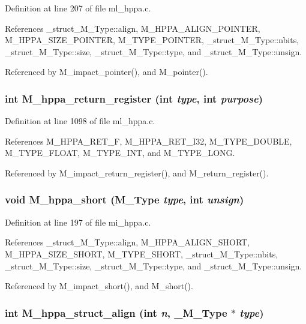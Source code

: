 Definition at line 207 of file ml\_\-hppa.c.

References \_\-struct\_\-M\_\-Type::align, M\_\-HPPA\_\-ALIGN\_\-POINTER, M\_\-HPPA\_\-SIZE\_\-POINTER, M\_\-TYPE\_\-POINTER, \_\-struct\_\-M\_\-Type::nbits, \_\-struct\_\-M\_\-Type::size, \_\-struct\_\-M\_\-Type::type, and \_\-struct\_\-M\_\-Type::unsign.

Referenced by M\_\-impact\_\-pointer(), and M\_\-pointer().
\subsubsection{\setlength{\rightskip}{0pt plus 5cm}int M\_\-hppa\_\-return\_\-register (int {\em type}, int {\em purpose})}\label{m__hppa_8h_fc6eeff2665dbbbff40338a13362c934}




Definition at line 1098 of file ml\_\-hppa.c.

References M\_\-HPPA\_\-RET\_\-F, M\_\-HPPA\_\-RET\_\-I32, M\_\-TYPE\_\-DOUBLE, M\_\-TYPE\_\-FLOAT, M\_\-TYPE\_\-INT, and M\_\-TYPE\_\-LONG.

Referenced by M\_\-impact\_\-return\_\-register(), and M\_\-return\_\-register().
\subsubsection{\setlength{\rightskip}{0pt plus 5cm}void M\_\-hppa\_\-short (\bf{M\_\-Type} {\em type}, int {\em unsign})}\label{m__hppa_8h_71252b95ead1065d55b2f2cd3063ad25}




Definition at line 197 of file mi\_\-hppa.c.

References \_\-struct\_\-M\_\-Type::align, M\_\-HPPA\_\-ALIGN\_\-SHORT, M\_\-HPPA\_\-SIZE\_\-SHORT, M\_\-TYPE\_\-SHORT, \_\-struct\_\-M\_\-Type::nbits, \_\-struct\_\-M\_\-Type::size, \_\-struct\_\-M\_\-Type::type, and \_\-struct\_\-M\_\-Type::unsign.

Referenced by M\_\-impact\_\-short(), and M\_\-short().
\subsubsection{\setlength{\rightskip}{0pt plus 5cm}int M\_\-hppa\_\-struct\_\-align (int {\em n}, \bf{\_\-M\_\-Type} $\ast$ {\em type})}\label{m__hppa_8h_6a52ac50752ae22b424b7c3bd7b28238}




